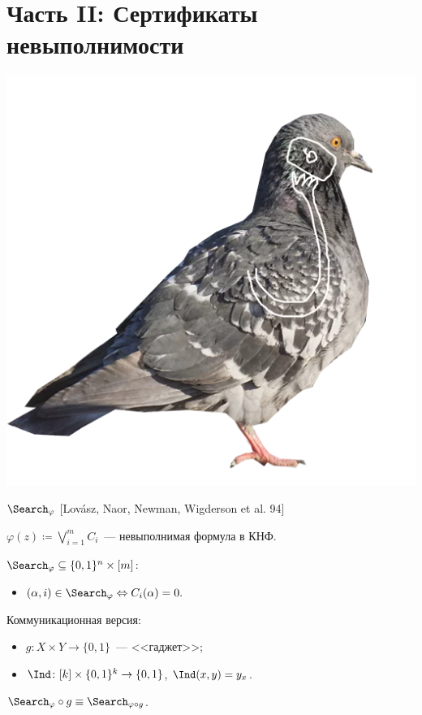 \section{Часть II: Сертификаты невыполнимости}

\begin{frame}
    \centering
    \insertsectionhead

    \vspace{0.3cm}
    \includegraphics[scale = 0.3]{pics/pigeon1.png}
\end{frame}


\begin{frame}{$\Search_{\varphi}$ [Lov{\'{a}}sz, Naor, Newman, Wigderson et al. 94]}
    
    $\varphi(z) \coloneqq \bigvee\limits_{i = 1}^{m} C_i$~--- невыполнимая формула в КНФ.
    \pause
    
    $\Search_{\varphi} \subseteq \{0, 1\}^n \times [m]$:
    \begin{itemize}
        \item $(\alpha, i) \in \Search_{\varphi} \Leftrightarrow C_{i}(\alpha) = 0.$
    \end{itemize}

    \pause
    \vspace{0.1cm}
    Коммуникационная версия:
    \begin{itemize}
        \item $g\colon X \times Y \to \{0, 1\}$~--- <<гаджет>>;
        \item $\Ind\colon [k] \times \{0, 1\}^k \to \{0, 1\}$, $\Ind(x, y) = y_x$.
    \end{itemize}

    \pause
    \begin{center}
        
    \end{center}


    $\Search_{\varphi} \circ g \equiv \Search_{\varphi \circ g}$.
\end{frame}




